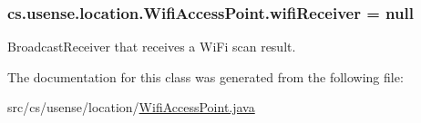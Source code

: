 \subsubsection[{wifi\+Receiver}]{ cs.\+usense.\+location.\+Wifi\+Access\+Point.\+wifi\+Receiver = null\hspace{0.3cm}{\ttfamily [private]}}\label{classcs_1_1usense_1_1location_1_1_wifi_access_point_a0bbe319038518690675af07a94c5d419}
Broadcast\+Receiver that receives a Wi\+Fi scan result. 

The documentation for this class was generated from the following file\+:\begin{DoxyCompactItemize}
\item 
src/cs/usense/location/\hyperlink{_wifi_access_point_8java}{Wifi\+Access\+Point.\+java}\end{DoxyCompactItemize}
